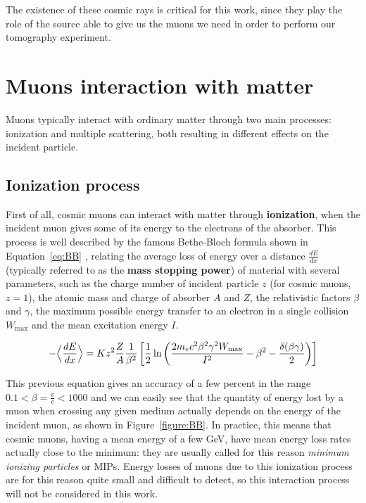 \documentclass[a4paper, 11pt]{report}
\begin{document}
The existence of these cosmic rays is critical for this work, since they play the role of the source able to give us the muons we need in order to perform our tomography experiment.

\section{Muons interaction with matter} \label{sec:interactions}

Muons typically interact with ordinary matter through two main processes: ionization and multiple scattering, both resulting in different effects on the incident particle.

\subsection{Ionization process}

First of all, cosmic muons can interact with matter through \textbf{ionization}, when the incident muon gives some of its energy to the electrons of the absorber. This process is well described by the famous Bethe-Bloch formula shown in Equation~\ref{eq:BB} \cite{PDGMuons}, relating the average loss of energy over a distance $\frac{dE}{dx}$ (typically referred to as the \textbf{mass stopping power}) of material with several parameters, such as the charge number of incident particle $z$ (for cosmic muons, $z = 1$), the atomic mass and charge of absorber $A$ and $Z$, the relativistic factors $\beta$ and $\gamma$, the maximum possible energy transfer to an electron in a single collision $W_{\text{max}}$ and the mean excitation energy $I$.

\begin{equation}
\label{eq:BB}
- \Bigl \langle \frac{dE}{dx} \Bigr \rangle = K z^2 \frac{Z}{A} \frac{1}{\beta^2} \left [\frac{1}{2} \ln \left (\frac{2 m_e c^2 \beta^2 \gamma^2 W_{\text{max}}}{I^2} - \beta^2 - \frac{\delta(\beta \gamma)}{2} \right ) \right ]
\end{equation}

This previous equation gives an accuracy of a few percent in the range $0.1 < \beta = \frac{v}{c} < 1000$ and we can easily see that the quantity of energy lost by a muon when crossing any given medium actually depends on the energy of the incident muon, as shown in Figure~\ref{figure:BB}. In practice, this means that cosmic muons, having a mean energy of a few GeV, have mean energy loss rates actually close to the minimum: they are usually called for this reason \textit{minimum ionizing particles} or MIPs. Energy losses of muons due to this ionization process are for this reason quite small and difficult to detect, so this interaction process will not be considered in this work.
\end{document}
